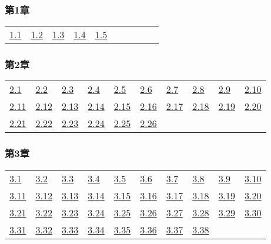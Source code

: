 \subsubsection*{第1章} 

\begin{tabular}{llllllllll}
\hyperref[図1.1]{1.1} &
\hyperref[図1.2]{1.2} &
\hyperref[図1.3]{1.3} &
\hyperref[図1.4]{1.4} &
\hyperref[図1.5]{1.5} &
\end{tabular} 

\subsubsection*{第2章} 

\begin{tabular}{llllllllll}
\hyperref[図2.1]{2.1} &
\hyperref[図2.2]{2.2} &
\hyperref[図2.3]{2.3} &
\hyperref[図2.4]{2.4} &
\hyperref[図2.5]{2.5} &
\hyperref[図2.6]{2.6} &
\hyperref[図2.7]{2.7} &
\hyperref[図2.8]{2.8} &
\hyperref[図2.9]{2.9} &
\hyperref[図2.10]{2.10}
\\ 
\hyperref[図2.11]{2.11} &
\hyperref[図2.12]{2.12} &
\hyperref[図2.13]{2.13} &
\hyperref[図2.14]{2.14} &
\hyperref[図2.15]{2.15} &
\hyperref[図2.16]{2.16} &
\hyperref[図2.17]{2.17} &
\hyperref[図2.18]{2.18} &
\hyperref[図2.19]{2.19} &
\hyperref[図2.20]{2.20}
\\ 
\hyperref[図2.21]{2.21} &
\hyperref[図2.22]{2.22} &
\hyperref[図2.23]{2.23} &
\hyperref[図2.24]{2.24} &
\hyperref[図2.25]{2.25} &
\hyperref[図2.26]{2.26} &
\end{tabular} 

\subsubsection*{第3章} 

\begin{tabular}{llllllllll}
\hyperref[図3.1]{3.1} &
\hyperref[図3.2]{3.2} &
\hyperref[図3.3]{3.3} &
\hyperref[図3.4]{3.4} &
\hyperref[図3.5]{3.5} &
\hyperref[図3.6]{3.6} &
\hyperref[図3.7]{3.7} &
\hyperref[図3.8]{3.8} &
\hyperref[図3.9]{3.9} &
\hyperref[図3.10]{3.10}
\\ 
\hyperref[図3.11]{3.11} &
\hyperref[図3.12]{3.12} &
\hyperref[図3.13]{3.13} &
\hyperref[図3.14]{3.14} &
\hyperref[図3.15]{3.15} &
\hyperref[図3.16]{3.16} &
\hyperref[図3.17]{3.17} &
\hyperref[図3.18]{3.18} &
\hyperref[図3.19]{3.19} &
\hyperref[図3.20]{3.20}
\\ 
\hyperref[図3.21]{3.21} &
\hyperref[図3.22]{3.22} &
\hyperref[図3.23]{3.23} &
\hyperref[図3.24]{3.24} &
\hyperref[図3.25]{3.25} &
\hyperref[図3.26]{3.26} &
\hyperref[図3.27]{3.27} &
\hyperref[図3.28]{3.28} &
\hyperref[図3.29]{3.29} &
\hyperref[図3.30]{3.30}
\\ 
\hyperref[図3.31]{3.31} &
\hyperref[図3.32]{3.32} &
\hyperref[図3.33]{3.33} &
\hyperref[図3.34]{3.34} &
\hyperref[図3.35]{3.35} &
\hyperref[図3.36]{3.36} &
\hyperref[図3.37]{3.37} &
\hyperref[図3.38]{3.38} &
\end{tabular} 

